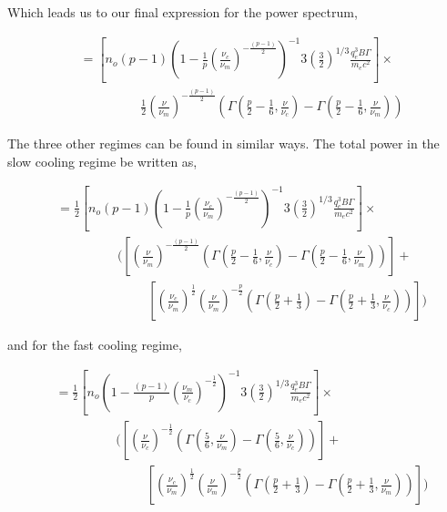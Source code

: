 \documentclass[linenumbers,twocolumn]{aastex631}
\begin{document}
\begin{appendix}
Which leads us to our final expression for the power spectrum,

\begin{align}
	&= \left[n_o (p-1) \left(1 - \frac{1}{p} \left(\frac{\nu_c}{\nu_m}\right)^{-\frac{(p-1)}{2}}\right)^{-1}  3 \left( \frac{3}{2}\right)^{1/3} \frac{q_e^3 B \Gamma}{m_e c^2} \right] \times \\ 
	& \hspace{2cm} \frac{1}{2} \left(\frac{\nu}{\nu_m}\right)^{-\frac{(p-1)}{2}} \left( \Gamma \left(\frac{p}{2} - \frac{1}{6}, \frac{\nu}{\nu_c}\right) - \Gamma \left(\frac{p}{2} - \frac{1}{6}, \frac{\nu}{\nu_m}\right) \right)
\end{align}

The three other regimes can be found in similar ways. The total power in the slow cooling regime be written as, 

\begin{align}
	&= \frac{1}{2} \left[n_o (p-1) \left(1 - \frac{1}{p} \left(\frac{\nu_c}{\nu_m}\right)^{-\frac{(p-1)}{2}}\right)^{-1}  3 \left( \frac{3}{2}\right)^{1/3} \frac{q_e^3 B \Gamma}{m_e c^2} \right] \times \\ 
	& \hspace{2cm} \Bigg(\left[\left(\frac{\nu}{\nu_m}\right)^{-\frac{(p-1)}{2}} \left( \Gamma \left(\frac{p}{2} - \frac{1}{6}, \frac{\nu}{\nu_c}\right) - \Gamma \left(\frac{p}{2} - \frac{1}{6}, \frac{\nu}{\nu_m}\right) \right) \right] +\\
	& \hspace{3cm} \left[\left(\frac{\nu_c}{\nu_m}\right)^{\frac{1}{2}} \left(\frac{\nu}{\nu_m}\right)^{-\frac{p}{2}} \left( \Gamma \left(\frac{p}{2} + \frac{1}{3}\right) - \Gamma \left(\frac{p}{2} + \frac{1}{3}, \frac{\nu}{\nu_c}\right) \right)\right]\Bigg)
\end{align}

and for the fast cooling regime,

\begin{align}
	&= \frac{1}{2} \left[n_o \left(1 - \frac{(p-1)}{p} \left(\frac{\nu_m}{\nu_c}\right)^{-\frac{1}{2}}\right)^{-1}  3 \left( \frac{3}{2}\right)^{1/3} \frac{q_e^3 B \Gamma}{m_e c^2} \right] \times \\ 
	& \hspace{2cm} \Bigg(\left[\left(\frac{\nu}{\nu_c}\right)^{-\frac{1}{2}} \left( \Gamma \left(\frac{5}{6}, \frac{\nu}{\nu_m}\right) - \Gamma \left(\frac{5}{6}, \frac{\nu}{\nu_c}\right) \right) \right] +\\
	& \hspace{3cm} \left[\left(\frac{\nu_c}{\nu_m}\right)^{\frac{1}{2}} \left(\frac{\nu}{\nu_m}\right)^{-\frac{p}{2}} \left( \Gamma \left(\frac{p}{2} + \frac{1}{3}\right) - \Gamma \left(\frac{p}{2} + \frac{1}{3}, \frac{\nu}{\nu_m}\right) \right)\right]\Bigg)
\end{align}

\end{appendix}
\end{document}
